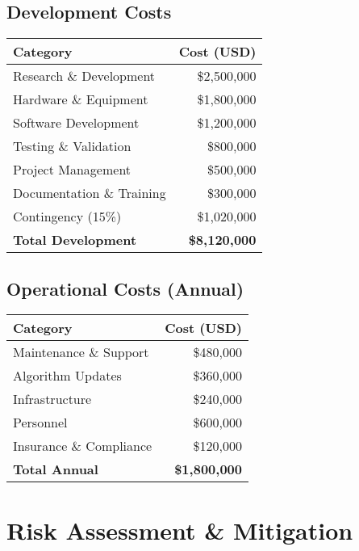 \documentclass[11pt,a4paper]{article}
\begin{document}
\subsection{Development Costs}
\begin{center}
\begin{tabular}{lr}
\toprule
\textbf{Category} & \textbf{Cost (USD)} \\
\midrule
Research \& Development & \$2,500,000 \\
Hardware \& Equipment & \$1,800,000 \\
Software Development & \$1,200,000 \\
Testing \& Validation & \$800,000 \\
Project Management & \$500,000 \\
Documentation \& Training & \$300,000 \\
Contingency (15\%) & \$1,020,000 \\
\midrule
\textbf{Total Development} & \textbf{\$8,120,000} \\
\bottomrule
\end{tabular}
\end{center}

\subsection{Operational Costs (Annual)}
\begin{center}
\begin{tabular}{lr}
\toprule
\textbf{Category} & \textbf{Cost (USD)} \\
\midrule
Maintenance \& Support & \$480,000 \\
Algorithm Updates & \$360,000 \\
Infrastructure & \$240,000 \\
Personnel & \$600,000 \\
Insurance \& Compliance & \$120,000 \\
\midrule
\textbf{Total Annual} & \textbf{\$1,800,000} \\
\bottomrule
\end{tabular}
\end{center}

\section{Risk Assessment \& Mitigation}
\end{document}
